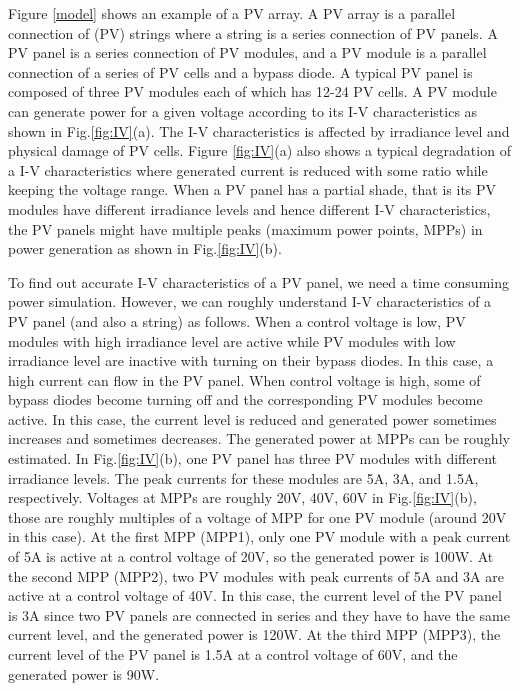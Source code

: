 \documentclass[conference]{IEEEtran}
\begin{document}
Figure \ref{model} shows an example of a PV array. A PV array is a parallel connection of (PV) strings where a string is a series connection of PV panels. A PV panel is a series connection of PV modules, and a PV module is a parallel connection of a series of PV cells and a bypass diode. A typical PV panel is composed of three PV modules each of which has 12-24 PV cells. A PV module can generate power for a given voltage according to its I-V characteristics as shown in Fig.\ref{fig:IV}(a). The I-V characteristics is affected by irradiance level and physical damage of PV cells. Figure \ref{fig:IV}(a) also shows a typical degradation of a I-V characteristics where generated current is reduced with some ratio while keeping the voltage range. When a PV panel has a partial shade, that is its PV modules have different irradiance levels and hence different I-V characteristics, the PV panels might have multiple peaks (maximum power points, MPPs) in power generation as shown in Fig.\ref{fig:IV}(b). 

To find out accurate I-V characteristics of a PV panel, we need a time consuming power simulation. However, we can roughly understand I-V characteristics of a PV panel (and also a string) as follows. When a control voltage is low, PV modules with high irradiance level are active while PV modules with low irradiance level are inactive with turning on their bypass diodes. In this case, a high current can flow in the PV panel. When control voltage is high, some of bypass diodes become turning off and the corresponding PV modules become active. In this case, the current level is reduced and generated power sometimes increases and sometimes decreases. The generated power at MPPs can be roughly estimated. In Fig.\ref{fig:IV}(b), one PV panel has three PV modules with different irradiance levels. The peak currents for these modules are 5A, 3A, and 1.5A, respectively. Voltages at MPPs are roughly 20V, 40V, 60V in Fig.\ref{fig:IV}(b), those are roughly multiples of a voltage of MPP for one PV module (around 20V in this case). At the first MPP (MPP1), only one PV module with a peak current of 5A is active at a control voltage of 20V, so the generated power is 100W. At the second MPP (MPP2), two PV modules with peak currents of 5A and 3A are active at a control voltage of 40V. In this case, the current level of the PV panel is 3A since two PV panels are connected in series and they have to have the same current level, and the generated power is 120W. At the third MPP (MPP3), the current level of the PV panel is 1.5A at a control voltage of 60V, and the generated power is 90W. 
\end{document}
